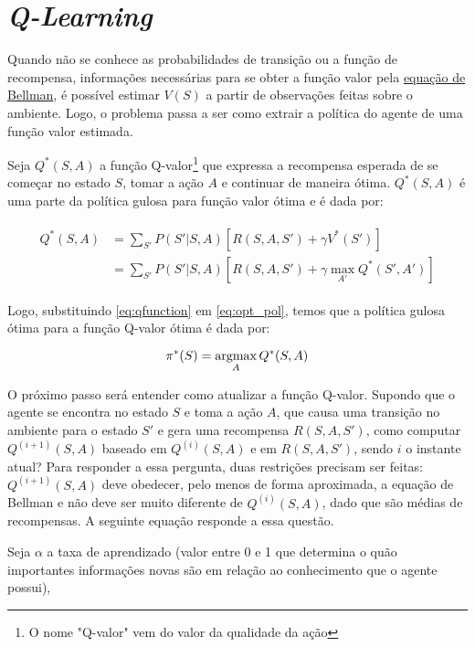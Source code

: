 
\section{\textit{Q-Learning}}
\label{sec:ql}

Quando não se conhece as probabilidades de transição ou a função de recompensa, informações necessárias para se obter a função valor pela \hyperref[eq:bellman]{equação de Bellman}, é possível estimar $V(S)$ a partir de observações feitas sobre o ambiente.
Logo, o problema passa a ser como extrair a política do agente de uma função valor estimada.

Seja $Q^{*}(S,A)$ a função Q-valor\footnote{O nome "Q-valor"{} vem do valor da qualidade da ação} que expressa a recompensa esperada de se começar no estado $S$, tomar a ação $A$ e continuar de maneira ótima. $Q^{*}(S,A)$ é uma parte da política gulosa para função valor ótima e é dada por:

\begin{align}
\begin{split}
Q^{*}(S,A) &= \sum_{S'}P(S'|S,A)[R(S,A,S') + \gamma V^{*}(S')] \\
        &= \sum_{S'}P(S'|S,A)[R(S,A,S') + \gamma \max_{A'}Q^{*}(S',A')]
\end{split}
\label{eq:qfunction}
\end{align}

Logo, substituindo \ref{eq:qfunction} em \ref{eq:opt_pol}, temos que a política gulosa ótima para a função Q-valor ótima é dada por:

\begin{equation} \label{eq:q_opt_pol}
\pi^{*}(S) = \operatorname*{argmax}_{A}Q^{*}(S,A)
\end{equation}

O próximo passo será entender como atualizar a função Q-valor.
Supondo que o agente se encontra no estado $S$ e toma a ação $A$, que causa uma transição no ambiente para o estado $S'$ e gera uma recompensa $R(S,A,S')$, como computar $Q^{(i+1)}(S,A)$ baseado em $Q^{(i)}(S,A)$ e em $R(S,A,S')$, sendo $i$ o instante atual?
Para responder a essa pergunta, duas restrições precisam ser feitas: $Q^{(i+1)}(S,A)$ deve obedecer, pelo menos de forma aproximada, a equação de Bellman e não deve ser muito diferente de $Q^{(i)}(S,A)$, dado que são médias de recompensas.
A seguinte equação responde a essa questão.

Seja $\alpha$ a taxa de aprendizado (valor entre 0 e 1 que determina o quão importantes informações novas são em relação ao conhecimento que o agente possui),

